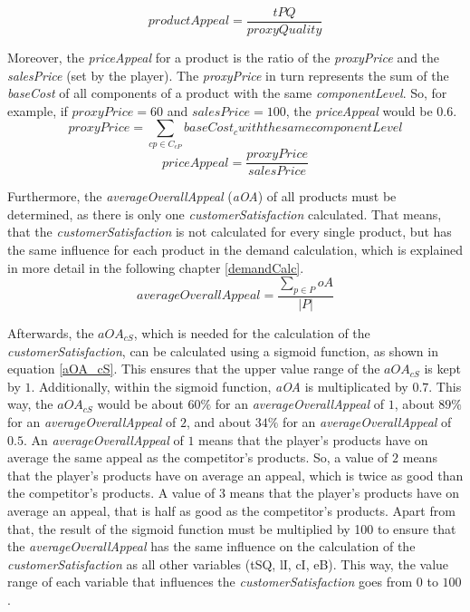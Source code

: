 \begin{equation}
    productAppeal = \dfrac{tPQ}{proxyQuality}
\end{equation}

Moreover, the \textit{priceAppeal} for a product is the ratio of the \textit{proxyPrice} and the \textit{salesPrice} (set by the player). The \textit{proxyPrice} in turn represents the sum of the \textit{baseCost} of all components of a product with the same \textit{componentLevel}. So, for example, if $proxyPrice = 60$ and $salesPrice = 100$, the \textit{priceAppeal} would be $0.6$.
\begin{equation}
    proxyPrice = \sum_{cp \in C_{cP}} baseCost_{c} with the same componentLevel
\end{equation}
\begin{equation}
    priceAppeal = \dfrac{proxyPrice}{salesPrice}
\end{equation}

Furthermore, the \textit{averageOverallAppeal} (\textit{\gls{aOA}}) of all products must be determined, as there is only one \textit{customerSatisfaction} calculated. That means, that the \textit{customerSatisfaction} is not calculated for every single product, but has the same influence for each product in the demand calculation, which is explained in more detail in the following chapter \ref{demandCalc}.
\begin{equation}
    averageOverallAppeal = \frac{\sum_{p \in P} oA}{|P|}
\end{equation}

Afterwards, the $aOA_{cS}$, which is needed for the calculation of the \textit{customerSatisfaction}, can be calculated using a sigmoid function, as shown in equation \ref{aOA_cS}. This ensures that the upper value range of the $aOA_{cS}$ is kept by $1$.
Additionally, within the sigmoid function, \textit{aOA} is multiplicated by $0.7$. This way, the $aOA_{cS}$ would be about $60\%$ for an \textit{averageOverallAppeal} of $1$, about $89\%$ for an \textit{averageOverallAppeal} of $2$, and about $34\%$ for an \textit{averageOverallAppeal} of $0.5$. An \textit{averageOverallAppeal} of $1$ means that the player's products have on average the same appeal as the competitor's products. So, a value of $2$ means that the player's products have on average an appeal, which is twice as good than the competitor's products. A value of $3$ means that the player's products have on average an appeal, that is half as good as the competitor's products. 
Apart from that, the result of the sigmoid function must be multiplied by 100 to ensure that the \textit{averageOverallAppeal} has the same influence on the calculation of the \textit{customerSatisfaction} as all other variables (tSQ, lI, cI, eB). This way, the value range of each variable that influences the \textit{customerSatisfaction} goes from $0$ to $100$.

